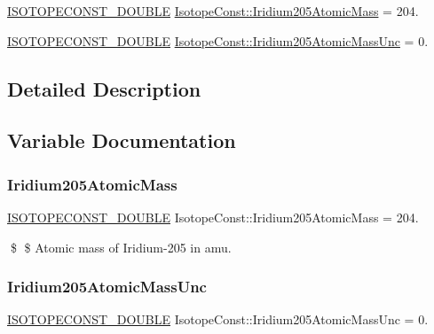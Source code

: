 \begin{DoxyCompactItemize}
\item 
\mbox{\hyperlink{group___isotope_const-_macros_ga8f45a7272ce02c0b4c65c44636ed719a}{I\+S\+O\+T\+O\+P\+E\+C\+O\+N\+S\+T\+\_\+\+D\+O\+U\+B\+LE}} \mbox{\hyperlink{group___isotope_const-_iridium-_ir205_ga38bc224794059944c99b0de03e62e3ec}{Isotope\+Const\+::\+Iridium205\+Atomic\+Mass}} = 204.
\item 
\mbox{\hyperlink{group___isotope_const-_macros_ga8f45a7272ce02c0b4c65c44636ed719a}{I\+S\+O\+T\+O\+P\+E\+C\+O\+N\+S\+T\+\_\+\+D\+O\+U\+B\+LE}} \mbox{\hyperlink{group___isotope_const-_iridium-_ir205_gaac96487812cf3f593f6ce9040e7a1a07}{Isotope\+Const\+::\+Iridium205\+Atomic\+Mass\+Unc}} = 0.
\end{DoxyCompactItemize}


\subsection{Detailed Description}


\subsection{Variable Documentation}
\mbox{\label{group___isotope_const-_iridium-_ir205_ga38bc224794059944c99b0de03e62e3ec}} 
\subsubsection{\texorpdfstring{Iridium205\+Atomic\+Mass}{Iridium205AtomicMass}}
{\footnotesize\ttfamily \mbox{\hyperlink{group___isotope_const-_macros_ga8f45a7272ce02c0b4c65c44636ed719a}{I\+S\+O\+T\+O\+P\+E\+C\+O\+N\+S\+T\+\_\+\+D\+O\+U\+B\+LE}} Isotope\+Const\+::\+Iridium205\+Atomic\+Mass = 204.}

\$ \$ Atomic mass of Iridium-\/205 in amu. \mbox{\label{group___isotope_const-_iridium-_ir205_gaac96487812cf3f593f6ce9040e7a1a07}} 
\subsubsection{\texorpdfstring{Iridium205\+Atomic\+Mass\+Unc}{Iridium205AtomicMassUnc}}
{\footnotesize\ttfamily \mbox{\hyperlink{group___isotope_const-_macros_ga8f45a7272ce02c0b4c65c44636ed719a}{I\+S\+O\+T\+O\+P\+E\+C\+O\+N\+S\+T\+\_\+\+D\+O\+U\+B\+LE}} Isotope\+Const\+::\+Iridium205\+Atomic\+Mass\+Unc = 0.}

